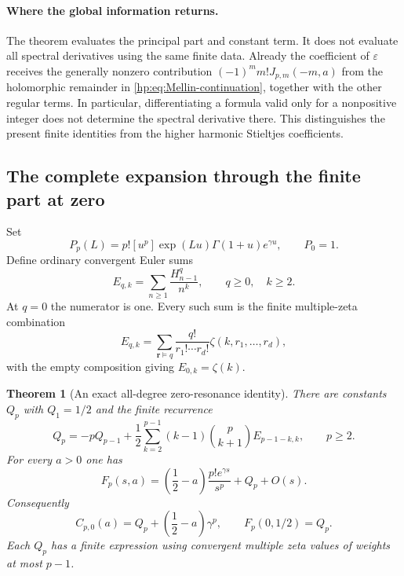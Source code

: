 \documentclass[11pt,a4paper]{article}
\numberwithin{equation}{section}
\newtheorem{theorem}{Theorem}[section]
\theoremstyle{definition}
\theoremstyle{remark}
\begin{document}
\paragraph{Where the global information returns.}
The theorem evaluates the principal part and constant term. It does
not evaluate all spectral derivatives using the same finite data.
Already the coefficient of $\varepsilon$ receives the generally nonzero
contribution $(-1)^m m!J_{p,m}(-m,a)$ from the holomorphic remainder
in \eqref{hp:eq:Mellin-continuation}, together with the other regular
terms. In particular, differentiating a formula valid only for a
nonpositive integer does not determine the spectral derivative there.
This distinguishes the present finite identities from the higher
harmonic Stieltjes coefficients.

\subsection{The complete expansion through the finite part at zero}

Set
\begin{equation}\label{hp:def:P}
 P_p(L)=p![u^p]\exp(Lu)\Gamma(1+u)e^{\gamma u},\qquad P_0=1.
\end{equation}
Define ordinary convergent Euler sums
\begin{equation}\label{hp:def:E}
 E_{q,k}=\sum_{n\ge1}\frac{H_{n-1}^q}{n^k},
 \qquad q\ge0,\quad k\ge2.
\end{equation}
At $q=0$ the numerator is one. Every such sum is the finite
multiple-zeta combination
\begin{equation}\label{hp:eq:E-MZV}
 E_{q,k}=\sum_{\boldsymbol{r}\vDash q}
       \frac{q!}{r_1!\cdots r_d!}\zeta(k,r_1,\ldots,r_d),
\end{equation}
with the empty composition giving $E_{0,k}=\zeta(k)$.

\begin{theorem}[An exact all-degree zero-resonance identity]
\label{hp:thm:zero}
There are constants $Q_p$ with $Q_1=1/2$ and the finite recurrence
\begin{equation}\label{hp:eq:Q-recurrence}
 Q_p=-pQ_{p-1}+
 \frac12\sum_{k=2}^{p-1}(k-1)\binom p{k+1}E_{p-1-k,k},
                       \qquad p\ge2.
\end{equation}
For every $a>0$ one has
\begin{equation}\label{hp:eq:zero-expansion}
 \boxed{\quad F_p(s,a)=
   \left(\frac12-a\right)\frac{p!e^{\gamma s}}{s^p}
                 +Q_p+O(s).\quad}
\end{equation}
Consequently
\begin{equation}\label{hp:eq:zero-FP}
 C_{p,0}(a)=Q_p+\left(\frac12-a\right)\gamma^p,
                  \qquad F_p(0,1/2)=Q_p.
\end{equation}
Each $Q_p$ has a finite expression using convergent multiple zeta
values of weights at most $p-1$.
\end{theorem}
\end{document}
